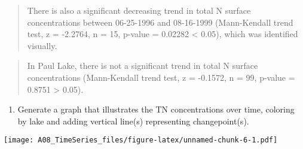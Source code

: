 \documentclass[]{article}
\newenvironment{Shaded}{\begin{snugshade}}{\end{snugshade}}
\newcommand{\KeywordTok}[1]{\textcolor[rgb]{0.13,0.29,0.53}{\textbf{#1}}}
\newcommand{\DataTypeTok}[1]{\textcolor[rgb]{0.13,0.29,0.53}{#1}}
\newcommand{\DecValTok}[1]{\textcolor[rgb]{0.00,0.00,0.81}{#1}}
\newcommand{\StringTok}[1]{\textcolor[rgb]{0.31,0.60,0.02}{#1}}
\newcommand{\OperatorTok}[1]{\textcolor[rgb]{0.81,0.36,0.00}{\textbf{#1}}}
\newcommand{\NormalTok}[1]{#1}
\providecommand{\tightlist}{%
  \setlength{\itemsep}{0pt}\setlength{\parskip}{0pt}}
\begin{document}
\begin{quote}
There is also a significant decreasing trend in total N surface
concentrations between 06-25-1996 and 08-16-1999 (Mann-Kendall trend
test, z = -2.2764, n = 15, p-value = 0.02282 \textless{} 0.05), which
was identified visually.
\end{quote}

\begin{quote}
In Paul Lake, there is not a significant trend in total N surface
concentrations (Mann-Kendall trend test, z = -0.1572, n = 99, p-value =
0.8751 \textgreater{} 0.05).
\end{quote}

\begin{enumerate}
\def\labelenumi{\arabic{enumi}.}
\setcounter{enumi}{4}
\tightlist
\item
  Generate a graph that illustrates the TN concentrations over time,
  coloring by lake and adding vertical line(s) representing
  changepoint(s).
\end{enumerate}

\begin{Shaded}
\end{Shaded}

\texttt{[image: A08\_TimeSeries\_files/figure-latex/unnamed-chunk-6-1.pdf]}
\end{document}

